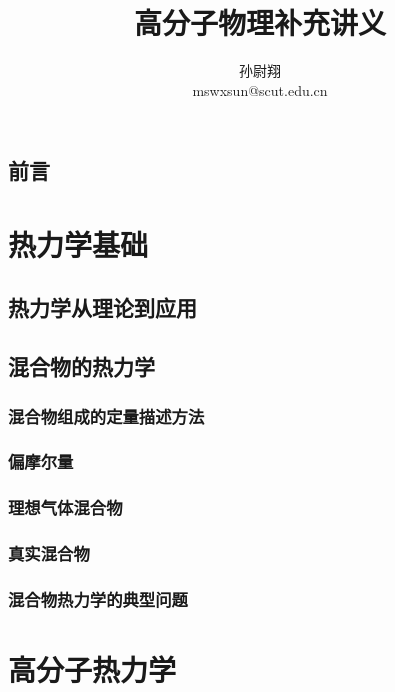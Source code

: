 \documentclass[zihao=5,linespread=1.3,b5paper,heading=true,twoside]{ctexbook}
\title{高分子物理补充讲义}
\author{孙尉翔\\mswxsun@scut.edu.cn}
\theoremstyle{definition}
\theoremstyle{plain}
\begin{document}
\maketitle
\chapter*{前言}\label{sec:preface}


\newpage\tableofcontents

\part{热力学基础}
\chapter{热力学从理论到应用}\label{sec:I_thermodynamic_relations}


\chapter{混合物的热力学}\label{sec:II 混合物的热力学}
\section{混合物组成的定量描述方法}\label{sec:II.1 composition_measures}

\section{偏摩尔量}\label{sec:II.2 partial_molar_quantities}

\section{理想气体混合物}\label{sec:II.3 ideal_mixture.tex}

\section{真实混合物}\label{sec:II.4 real_mixture}

\section{混合物热力学的典型问题}\label{sec:II.5 typical_problems}


\part{高分子热力学}
\end{document}
